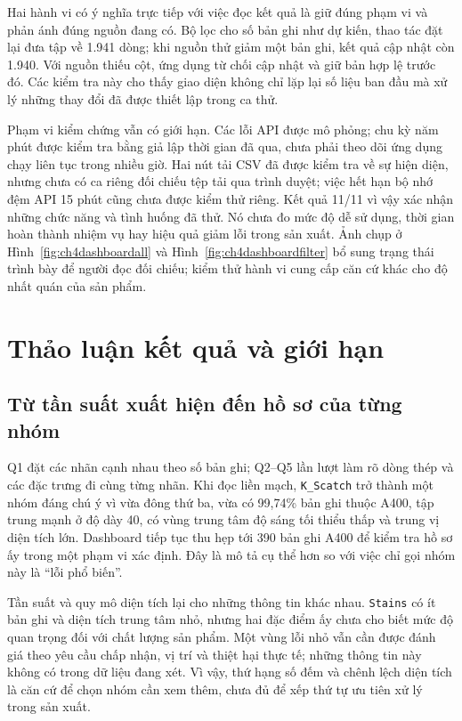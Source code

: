 \documentclass[12pt,a4paper,oneside]{report}
\newcommand{\maCot}[1]{{\urlstyle{tt}\def\UrlBreaks{\do\_\do\/\do\.}\def\UrlBigBreaks{}\nolinkurl{#1}}}
\begin{document}
Hai hành vi có ý nghĩa trực tiếp với việc đọc kết quả là giữ đúng phạm vi và phản ánh đúng nguồn đang có. Bộ lọc cho số bản ghi như dự kiến, thao tác đặt lại đưa tập về 1.941 dòng; khi nguồn thử giảm một bản ghi, kết quả cập nhật còn 1.940. Với nguồn thiếu cột, ứng dụng từ chối cập nhật và giữ bản hợp lệ trước đó. Các kiểm tra này cho thấy giao diện không chỉ lặp lại số liệu ban đầu mà xử lý những thay đổi đã được thiết lập trong ca thử.

Phạm vi kiểm chứng vẫn có giới hạn. Các lỗi API được mô phỏng; chu kỳ năm phút được kiểm tra bằng giả lập thời gian đã qua, chưa phải theo dõi ứng dụng chạy liên tục trong nhiều giờ. Hai nút tải CSV đã được kiểm tra về sự hiện diện, nhưng chưa có ca riêng đối chiếu tệp tải qua trình duyệt; việc hết hạn bộ nhớ đệm API 15 phút cũng chưa được kiểm thử riêng. Kết quả 11/11 vì vậy xác nhận những chức năng và tình huống đã thử. Nó chưa đo mức độ dễ sử dụng, thời gian hoàn thành nhiệm vụ hay hiệu quả giảm lỗi trong sản xuất. Ảnh chụp ở Hình~\ref{fig:ch4dashboardall} và Hình~\ref{fig:ch4dashboardfilter} bổ sung trạng thái trình bày để người đọc đối chiếu; kiểm thử hành vi cung cấp căn cứ khác cho độ nhất quán của sản phẩm.

\section{Thảo luận kết quả và giới hạn}
\label{sec:ch4thaoluan}

\subsection{Từ tần suất xuất hiện đến hồ sơ của từng nhóm}

Q1 đặt các nhãn cạnh nhau theo số bản ghi; Q2--Q5 lần lượt làm rõ dòng thép và các đặc trưng đi cùng từng nhãn. Khi đọc liền mạch, \maCot{K_Scatch} trở thành một nhóm đáng chú ý vì vừa đông thứ ba, vừa có 99,74\% bản ghi thuộc A400, tập trung mạnh ở độ dày 40, có vùng trung tâm độ sáng tối thiểu thấp và trung vị diện tích lớn. Dashboard tiếp tục thu hẹp tới 390 bản ghi A400 để kiểm tra hồ sơ ấy trong một phạm vi xác định. Đây là mô tả cụ thể hơn so với việc chỉ gọi nhóm này là ``lỗi phổ biến''.

Tần suất và quy mô diện tích lại cho những thông tin khác nhau. \maCot{Stains} có ít bản ghi và diện tích trung tâm nhỏ, nhưng hai đặc điểm ấy chưa cho biết mức độ quan trọng đối với chất lượng sản phẩm. Một vùng lỗi nhỏ vẫn cần được đánh giá theo yêu cầu chấp nhận, vị trí và thiệt hại thực tế; những thông tin này không có trong dữ liệu đang xét. Vì vậy, thứ hạng số đếm và chênh lệch diện tích là căn cứ để chọn nhóm cần xem thêm, chưa đủ để xếp thứ tự ưu tiên xử lý trong sản xuất.
\end{document}

